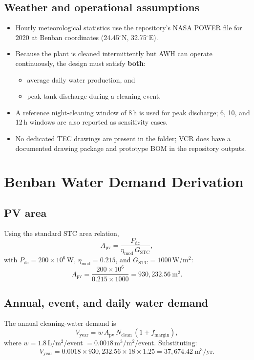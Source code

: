 \documentclass[11pt,a4paper]{article}
\begin{document}
\subsection{Weather and operational assumptions}
\begin{itemize}[leftmargin=*]
  \item Hourly meteorological statistics use the repository's NASA POWER file for 2020 at Benban coordinates (24.45$^\circ$N, 32.75$^\circ$E).
  \item Because the plant is cleaned intermittently but AWH can operate continuously, the design must satisfy \textbf{both}:
  \begin{itemize}[nosep]
    \item average daily water production, and
    \item peak tank discharge during a cleaning event.
  \end{itemize}
  \item A reference night-cleaning window of 8\,h is used for peak discharge; 6, 10, and 12\,h windows are also reported as sensitivity cases.
  \item No dedicated TEC drawings are present in the folder; VCR does have a documented drawing package and prototype BOM in the repository outputs.
\end{itemize}

\section{Benban Water Demand Derivation}
\subsection{PV area}
Using the standard STC area relation,
\begin{equation}
A_{\mathrm{pv}}=\frac{P_{\mathrm{dc}}}{\eta_{\mathrm{mod}}\,G_{\mathrm{STC}}},
\end{equation}
with $P_{\mathrm{dc}}=200\times 10^6$\,W, $\eta_{\mathrm{mod}}=0.215$, and $G_{\mathrm{STC}}=1000$\,W/m$^2$:
\begin{equation}
A_{\mathrm{pv}}=\frac{200\times 10^6}{0.215\times 1000}=930{,}232.56\ \mathrm{m^2}.
\end{equation}

\subsection{Annual, event, and daily water demand}
The annual cleaning-water demand is
\begin{equation}
V_{\mathrm{year}} = w\,A_{\mathrm{pv}}\,N_{\mathrm{clean}}\,(1+f_{\mathrm{margin}}),
\end{equation}
where $w=1.8$\,L/m$^2$/event $=0.0018$\,m$^3$/m$^2$/event. Substituting:
\begin{equation}
V_{\mathrm{year}} = 0.0018\times 930{,}232.56\times 18\times 1.25
=37{,}674.42\ \mathrm{m^3/yr}.
\end{equation}
\end{document}
